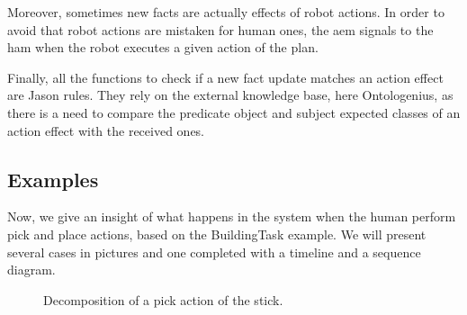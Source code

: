 \documentclass[a4paper,11pt,twoside]{StyleThese}
\begin{document}
Moreover, sometimes new facts are actually effects of robot actions. In order to avoid that robot actions are mistaken for human ones, the \acrshort{aem} signals to the \acrlong{ham} when the robot executes a given action of the plan. 

Finally, all the functions to check if a new fact update matches an action effect are Jason rules. They rely on the external knowledge base, here Ontologenius, as there is a need to compare the predicate object and subject expected classes of an action effect with the received ones.

\thispagestyle{example}
\subsection*{Examples}
Now, we give an insight of what happens in the system when the human perform pick and place actions, based on the BuildingTask example. We will present several cases in pictures and one completed with a timeline and a sequence diagram.

\begin{figure}[!htp]
	\hfill
	\hfill
	\hfill
	\caption{Decomposition of a pick action of the stick.}
	\label{chap6:fig:action_monitoring_photos_pick}
\end{figure}
\end{document}
